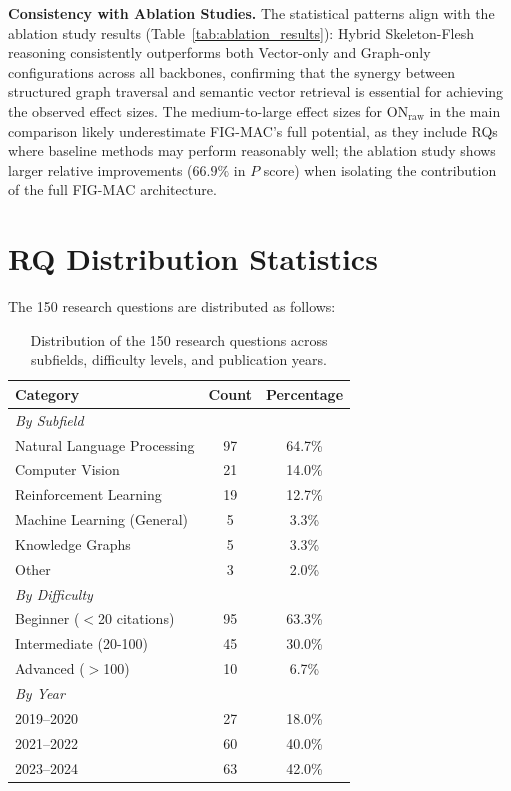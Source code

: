 \documentclass[runningheads]{llncs}
\begin{document}
\textbf{Consistency with Ablation Studies.} The statistical patterns align with the ablation study results (Table~\ref{tab:ablation_results}): Hybrid Skeleton-Flesh reasoning consistently outperforms both Vector-only and Graph-only configurations across all backbones, confirming that the synergy between structured graph traversal and semantic vector retrieval is essential for achieving the observed effect sizes. The medium-to-large effect sizes for ON$_{\text{raw}}$ in the main comparison likely underestimate FIG-MAC's full potential, as they include RQs where baseline methods may perform reasonably well; the ablation study shows larger relative improvements ($66.9\%$ in $P$ score) when isolating the contribution of the full FIG-MAC architecture.

\section{RQ Distribution Statistics}
\label{app:rq_distribution}

The 150 research questions are distributed as follows:

\begin{table}[h]
\centering
\small
\begin{tabular}{lcc}
\toprule
\textbf{Category} & \textbf{Count} & \textbf{Percentage} \\
\midrule
\multicolumn{3}{l}{\textit{By Subfield}} \\
Natural Language Processing & 97 & 64.7\% \\
Computer Vision & 21 & 14.0\% \\
Reinforcement Learning & 19 & 12.7\% \\
Machine Learning (General) & 5 & 3.3\% \\
Knowledge Graphs & 5 & 3.3\% \\
Other & 3 & 2.0\% \\
\midrule
\multicolumn{3}{l}{\textit{By Difficulty}} \\
Beginner ($<$20 citations) & 95 & 63.3\% \\
Intermediate (20-100) & 45 & 30.0\% \\
Advanced ($>$100) & 10 & 6.7\% \\
\midrule
\multicolumn{3}{l}{\textit{By Year}} \\
2019--2020 & 27 & 18.0\% \\
2021--2022 & 60 & 40.0\% \\
2023--2024 & 63 & 42.0\% \\
\bottomrule
\end{tabular}
\caption{Distribution of the 150 research questions across subfields, difficulty levels, and publication years.}
\label{tab:rq_distribution}
\end{table}
\end{document}
